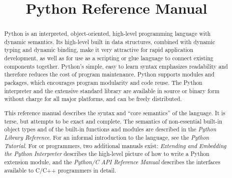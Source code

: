 \documentclass{manual}
\title{Python Reference Manual}
\begin{document}
\maketitle



\begin{abstract}

\noindent
Python is an interpreted, object-oriented, high-level programming
language with dynamic semantics.  Its high-level built in data
structures, combined with dynamic typing and dynamic binding, make it
very attractive for rapid application development, as well as for use
as a scripting or glue language to connect existing components
together.  Python's simple, easy to learn syntax emphasizes
readability and therefore reduces the cost of program
maintenance.  Python supports modules and packages, which encourages
program modularity and code reuse.  The Python interpreter and the
extensive standard library are available in source or binary form
without charge for all major platforms, and can be freely distributed.

This reference manual describes the syntax and ``core semantics'' of
the language.  It is terse, but attempts to be exact and complete.  The
semantics of non-essential built-in object types and of the built-in
functions and modules are described in the \emph{Python Library
Reference}.  For an informal introduction to the language, see the
\emph{Python Tutorial}.  For \C{} or \Cpp{} programmers, two additional
manuals exist: \emph{Extending and Embedding the Python Interpreter}
describes the high-level picture of how to write a Python extension
module, and the \emph{Python/C API Reference Manual} describes the
interfaces available to C/C++ programmers in detail.

\end{abstract}

\tableofcontents



\end{document}
